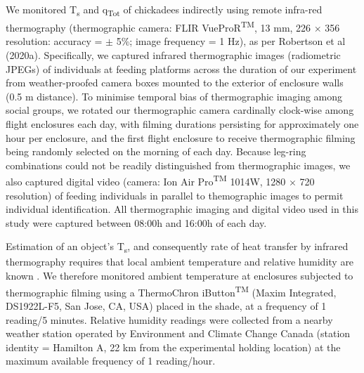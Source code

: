 \documentclass[12pt]{article}
\begin{document}
\noindent We monitored T\textsubscript{s} and q\textsubscript{Tot} of chickadees indirectly using remote infra-red thermography (thermographic camera: FLIR VueProR\textsuperscript{TM}, 13 mm, 226 $\times$ 356 resolution: accuracy = $\pm$ 5\%; image frequency = 1 Hz), as per Robertson et al (2020a). Specifically, we captured infrared thermographic images (radiometric JPEGs) of individuals at feeding platforms across the duration of our experiment from weather-proofed camera boxes mounted to the exterior of enclosure walls (0.5 m distance). To minimise temporal bias of thermographic imaging among social groups, we rotated our thermographic camera cardinally clock-wise among flight enclosures each day, with filming durations persisting for approximately one hour per enclosure, and the first flight enclosure to receive thermographic filming being randomly selected on the morning of each day. Because leg-ring combinations could not be readily distinguished from thermographic images, we also captured digital video (camera: Ion Air Pro\textsuperscript{TM} 1014W, 1280 $\times$ 720 resolution) of feeding individuals in parallel to themographic images to permit individual identification. All thermographic imaging and digital video used in this study were captured between 08:00h and 16:00h of each day. \vspace{1cm}
  
\noindent Estimation of an object's T\textsubscript{s}, and consequently rate of heat transfer by infrared thermography requires that local ambient temperature and relative humidity are known \citep{minkina_2009,tattersall_2016}. We therefore monitored ambient temperature at enclosures subjected to thermographic filming using a ThermoChron iButton\textsuperscript{TM} (Maxim Integrated, DS1922L-F5, San Jose, CA, USA) placed in the shade, at a frequency of 1 reading/5 minutes. Relative humidity readings were collected from a nearby weather station operated by Environment and Climate Change Canada (station identity = Hamilton A, 22 km from the experimental holding location) at the maximum available frequency of 1 reading/hour. \vspace{1cm} 
\end{document}

